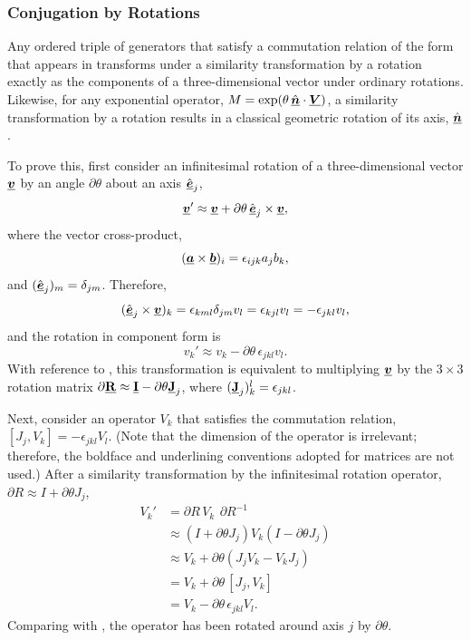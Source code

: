\subsubsection{Conjugation by Rotations}

Any ordered triple of generators that satisfy a commutation relation of the form that appears 
in  transforms under a similarity transformation
by a rotation exactly as the components of a three-dimensional vector under ordinary rotations.  
%
Likewise, for any exponential operator, $M = \exp(\theta \, \hat{\underline{\mbox{\boldmath $n$}}} \cdot \underline{\mbox{\boldmath $V$}})$, 
a similarity transformation by a rotation results in a classical geometric rotation 
of its axis, $\hat{\underline{\mbox{\boldmath $n$}}}$.

To prove this, first consider an infinitesimal rotation of a three-dimensional vector $\underline{\mbox{\boldmath $v$}}$ 
by an angle $\partial\theta$ about an axis $\hat{\underline{\mbox{\boldmath $e$}}}_j$,
\begin{equation}
    \underline{\mbox{\boldmath $v$}}' \approx \underline{\mbox{\boldmath $v$}} + \partial\theta \, \hat{\underline{\mbox{\boldmath $e$}}}_j \times \underline{\mbox{\boldmath $v$}},
\end{equation}
%
where the vector cross-product,
\begin{equation}
(\underline{\mbox{\boldmath $a$}} \times \underline{\mbox{\boldmath $b$}})_i =  \epsilon_{ijk} a_j b_k,
\end{equation}
and $(\hat{\underline{\mbox{\boldmath $e$}}}_j)_m = \delta_{jm}$.  Therefore,
\begin{equation}
    (\hat{\underline{\mbox{\boldmath $e$}}}_j  \times \underline{\mbox{\boldmath $v$}})_k
    = \epsilon_{kml} \delta_{jm} v_l
    = \epsilon_{kjl} v_l 
    = -\epsilon_{jkl} v_l,
\end{equation}
and the rotation in component form is
\begin{equation} \label{eqn:class_vec}
    v_k' \approx v_k - \partial\theta \, \epsilon_{jkl} v_l.
\end{equation}
%
With reference to ,
this transformation is equivalent to multiplying $\underline{\mbox{\boldmath $v$}}$ by the $3 \times 3$ rotation matrix 
$\partial\underline{{\bf R}} \approx \underline{{\bf I}} - \partial\theta \underline{{\bf J}}_j$, where $(\underline{{\bf J}}_j)_k^l = \epsilon_{jkl}$. 

Next, consider an operator $V_k$ that satisfies the commutation relation, $[J_j, V_k] = - \epsilon_{jkl} V_l$.
(Note that the dimension of the operator is irrelevant; therefore, the boldface and underlining conventions
adopted for matrices are not used.)
After a similarity transformation by the infinitesimal rotation operator, $\partial R \approx I + \partial\theta J_j$,
\begin{equation}
\begin{split}
    V_k' &= \partial R \, V_k \ \, \partial R^{-1} \\
         &\approx (I + \partial\theta J_j) V_k (I - \partial\theta J_j) \\
         &\approx V_k + \partial\theta (J_j V_k - V_k J_j) \\
         &= V_k + \partial\theta \, [J_j, V_k] \\
         &= V_k - \partial\theta \, \epsilon_{jkl} V_l.
\end{split}
\end{equation}
%
Comparing with , the operator has been rotated around axis $j$ by $\partial\theta$. 

